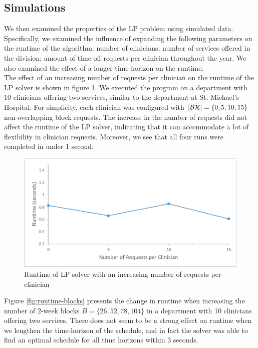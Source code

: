 \subsection{Simulations}
We then examined the properties of the LP problem using simulated data. Specifically, we examined the influence of expanding the following parameters on the runtime of the algorithm: number of clinicians; number of services offered in the division; amount of time-off requests per clinician throughout the year. We also examined the effect of a longer time-horizon on the runtime. \\

The effect of an increasing number of requests per clinician on the runtime of the LP solver is shown in figure \ref{fig:runtime-requests}. We executed the program on a department with 10 clinicians offering two services, similar to the department at St. Michael's Hospital. For simplicity, each clinician was configured with $\abs{\mathcal{BR}} = \{0, 5, 10, 15\}$ non-overlapping block requests. The increase in the number of requests did not affect the runtime of the LP solver, indicating that it can accommodate a lot of flexibility in clinician requests. Moreover, we see that all four runs were completed in under 1 second. \\

\begin{figure}[h]
	\centering
	\includegraphics[scale=.5]{fig/runtime_requests}
	\caption{Runtime of LP solver with an increasing number of requests per clinician}
	\label{fig:runtime-requests}
\end{figure}

Figure \ref{fig:runtime-blocks} presents the change in runtime when increasing the number of 2-week blocks $B = \{26, 52, 78, 104\}$ in a department with 10 clinicians offering two services. There does not seem to be a strong effect on runtime when we lengthen the time-horizon of the schedule, and in fact the solver was able to find an optimal schedule for all time horizons within 3 seconds. \\ %

